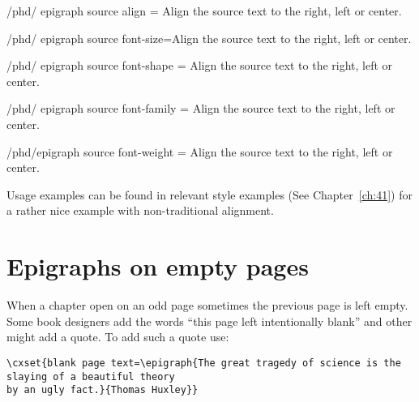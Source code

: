 \begin{key}{/phd/ epigraph source align = }
Align the source text to the right, left or center.
\end{key}

\begin{key}{/phd/ epigraph source font-size=}Align the source text to the right, left or center.
\end{key}

\begin{key}{/phd/ epigraph source font-shape = }
Align the source text to the right, left or center.
\end{key}

\begin{key}{/phd/ epigraph source font-family = }Align the source text to the right, left or center.
\end{key}


\begin{key}{/phd/epigraph source font-weight = }
Align the source text to the right, left or center.
\end{key}


Usage examples can be found in relevant style examples (See Chapter~\ref{ch:41}) for a rather 
nice example with non-traditional alignment.

\section{Epigraphs on empty pages}

When a chapter open on an odd page sometimes the  previous page is left empty. Some book designers 
add the words ``this page left intentionally blank'' and other might add a quote. To add such a quote use:

\begin{tcolorbox}
\begin{lstlisting}
\cxset{blank page text=\epigraph{The great tragedy of science is the slaying of a beautiful theory
by an ugly fact.}{Thomas Huxley}}
\end{lstlisting}
\end{tcolorbox}
